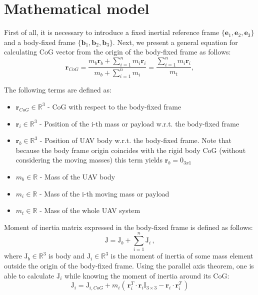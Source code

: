 \section{Mathematical model} \label{sec:model}

First of all, it is necessary to introduce a fixed inertial reference frame $\{  \textbf{e}_1,  \textbf{e}_2,  \textbf{e}_3  \}$ and a body-fixed frame $ \{  \textbf{b}_1,  \textbf{b}_2,  \textbf{b}_3 \}$. Next, we present
a general equation for calculating CoG vector from the origin of the body-fixed frame as follows: 
\begin{equation}
	\textbf{r}_{CoG} = \frac{m_{b}\textbf{r}_{b} + \sum_{i=1}^n m_{i} \textbf{r}_{i}}{m_{b} + \sum_{i=1}^n m_{i}} = \frac{\sum_{i=1}^n m_{i}\textbf{r}_{i}}{m_t},
	\label{equ:cog}
\end{equation}

The following terms are defined as: 
\begin{itemize}
	\item $ \textbf{r}_{CoG} \in \mathbb{R}^3$ - CoG with respect to the body-fixed frame
	
	\item $ \textbf{r}_{i} \in \mathbb{R}^3$ - Position of the i-th mass or payload w.r.t. the body-fixed frame
	
	\item $ \textbf{r}_{b} \in \mathbb{R}^3$ - Position of UAV body w.r.t. the body-fixed frame. Note that because the body frame origin coincides with the rigid body CoG (without considering the moving masses) this term yields $ \textbf{r}_b = 0_{3x1}$
	
	\item $m_b \in \mathbb{R}$ - Mass of the UAV body 
	
	\item $m_i \in \mathbb{R}$ - Mass of the i-th moving mass or payload
	
	\item $m_t \in \mathbb{R}$ - Mass of the whole UAV system
\end{itemize}

Moment of inertia matrix expressed in the body-fixed frame is defined as follows:
\begin{equation}
\text{J} = \text{J}_b + \sum_{i=1}^{n}\text{J}_i \, ,
\end{equation}
where $\text{J}_b \in \mathbb{R}^3$ is body and $\text{J}_i \in \mathbb{R}^3$ is the moment of inertia of some mass element outside the origin of the body-fixed frame. Using the parallel axis theorem, one is able to calculate $\text{J}_i$ while knowing the moment of inertia around its CoG:
\begin{equation}
\text{J}_i = \text{J}_{i,CoG} + m_i(\, \textbf{r}_i^T \cdot  \textbf{r}_i \text{I}_{3 \times 3} -  \textbf{r}_i \cdot  \textbf{r}_i^T \,)
\end{equation}


